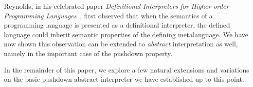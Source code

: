 Reynolds, in his celebrated paper \emph{Definitional Interpreters for
Higher-order Programming Languages}~\cite{dvanhorn:reynolds-acm72}, first
observed that when the semantics of a programming language is presented as a
definitional interpreter, the defined language could inherit semantic
properties of the defining metalanguage.  We have now shown this observation
can be extended to \emph{abstract} interpretation as well, namely in the
important case of the pushdown property.

In the remainder of this paper, we explore a few natural extensions and
variations on the basic pushdown abstract interpreter we have established up to
this point.
